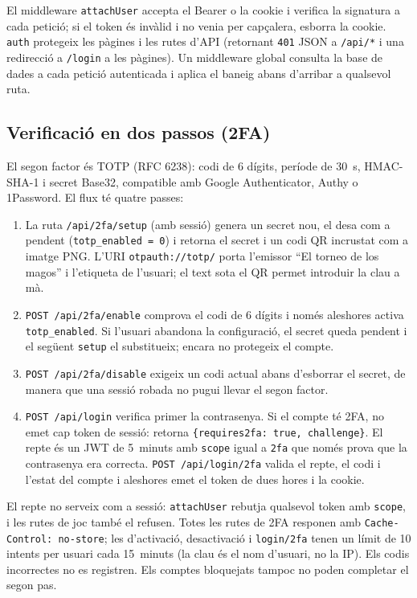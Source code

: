 \documentclass[11pt,a4paper]{article}
\begin{document}
El middleware \texttt{attachUser} accepta el Bearer o la cookie i verifica la signatura
a cada petició; si el token és invàlid i no venia per capçalera, esborra la cookie.
\texttt{auth} protegeix les pàgines i les rutes d'API (retornant \texttt{401} JSON a
\texttt{/api/*} i una redirecció a \texttt{/login} a les pàgines). Un middleware global
consulta la base de dades a cada petició autenticada i aplica el baneig abans d'arribar
a qualsevol ruta.

\subsection{Verificació en dos passos (2FA)}

El segon factor és TOTP (RFC 6238): codi de 6 dígits, període de 30~s, HMAC-SHA-1 i
secret Base32, compatible amb Google Authenticator, Authy o 1Password. El flux té
quatre passes:

\begin{enumerate}[nosep]
  \item La ruta \texttt{/api/2fa/setup} (amb sessió) genera un secret nou, el desa com
        a pendent (\texttt{totp\_enabled = 0}) i retorna el secret i un codi QR
        incrustat com a imatge PNG\@. L'URI \texttt{otpauth://totp/} porta l'emissor
        \enquote{El torneo de los magos} i l'etiqueta de l'usuari; el text sota el QR
        permet introduir la clau a mà.
  \item \texttt{POST /api/2fa/enable} comprova el codi de 6 dígits i només aleshores
        activa \texttt{totp\_enabled}. Si l'usuari abandona la configuració, el secret
        queda pendent i el següent \texttt{setup} el substitueix; encara no protegeix
        el compte.
  \item \texttt{POST /api/2fa/disable} exigeix un codi actual abans d'esborrar el
        secret, de manera que una sessió robada no pugui llevar el segon factor.
  \item \texttt{POST /api/login} verifica primer la contrasenya. Si el compte té 2FA,
        no emet cap token de sessió: retorna \texttt{\{requires2fa: true, challenge\}}.
        El repte és un JWT de 5~minuts amb \texttt{scope} igual a \texttt{2fa} que
        només prova que la contrasenya era correcta. \texttt{POST /api/login/2fa}
        valida el repte, el codi
        i l'estat del compte i aleshores emet el token de dues hores i la cookie.
\end{enumerate}

El repte no serveix com a sessió: \texttt{attachUser} rebutja qualsevol token amb
\texttt{scope}, i les rutes de joc també el refusen. Totes les rutes de 2FA responen
amb \texttt{Cache-Control: no-store}; les d'activació, desactivació i
\texttt{login/2fa} tenen un límit de 10 intents per usuari cada 15~minuts (la clau és
el nom d'usuari, no la IP). Els codis incorrectes no es registren. Els comptes
bloquejats tampoc no poden completar el segon pas.
\end{document}
